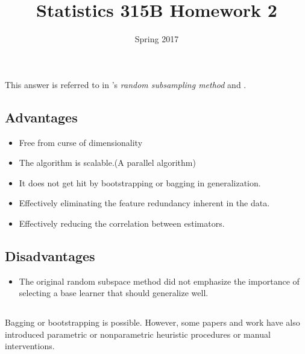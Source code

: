 \documentclass[11pt,a4paper]{article}
\begin{document}
\title{Statistics 315B Homework 2}
\author{Spring 2017}

\maketitle

\renewcommand{\thesubsection}{\thesection.\alph{subsection}}

\section{}

This answer is referred to in \cite{ho1998random}'s \textit{random subsampling method} and \cite{li2009weighted}.

\subsection{Advantages}
\begin{itemize}
    \item Free from curse of dimensionality
    \item The algorithm is scalable.(A parallel algorithm)
    \item It does not get hit by bootstrapping or bagging in generalization.
    \item Effectively eliminating the feature redundancy inherent in the data.
    \item Effectively reducing the correlation between estimators.
\end{itemize}

\subsection{Disadvantages}
\begin{itemize}
    \item The original random subspace method did not emphasize the importance of selecting a base learner that should generalize well.
\end{itemize}

\subsection{}
Bagging or bootstrapping is possible. However, some papers and work\cite{shlien1990multiple}\cite{shlien1992nonparametric} have also introduced parametric or nonparametric heuristic procedures or manual interventions.

\section{}




\end{document}
